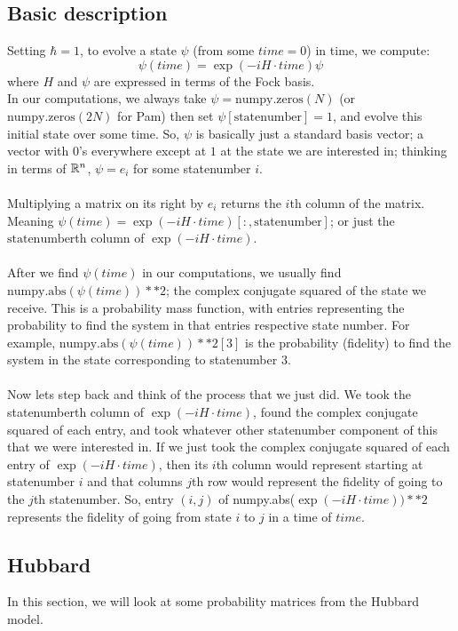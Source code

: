 \subsection{Basic description}
Setting $\hbar=1$, to evolve a state $\psi$ (from some $time=0$) in time, we compute:
\[\psi(time)=\exp(-iH\cdot time)\psi\]
where $H$ and $\psi$ are expressed in terms of the Fock basis. \\
In our computations, we always take $\psi=\text{numpy.zeros}(N)$ (or $\text{numpy.zeros}(2N)$ for Pam) then set $\psi[\text{statenumber}]=1$, and evolve this initial state over some time.
So, $\psi$ is basically just a standard basis vector; a vector with $0$'s everywhere except at $1$ at the state we are interested in; thinking in terms of $\mathbb{R}^n$, $\psi=e_i$ for some statenumber $i$. \\
\\
Multiplying a matrix on its right by $e_i$ returns the $i$th column of the matrix.
Meaning $\psi(time)=\exp(-iH\cdot time)[:,\text{statenumber}]$; or just the $\text{statenumber}$th column of $\exp(-iH\cdot time)$. \\
\\
After we find $\psi(time)$ in our computations, we usually find $\text{numpy.abs}(\psi(time))**2$; the complex conjugate squared of the state we receive.
This is a probability mass function, with entries representing the probability to find the system in that entries respective state number.
For example, $\text{numpy.abs}(\psi(time))**2[3]$ is the probability (fidelity) to find the system in the state corresponding to statenumber $3$. \\
\\
Now lets step back and think of the process that we just did.
We took the statenumberth column of $\exp(-iH\cdot time)$, found the complex conjugate squared of each entry, and took whatever other statenumber component of this that we were interested in.
If we just took the complex conjugate squared of each entry of $\exp(-iH\cdot time)$, then its $i$th column would represent starting at statenumber $i$ and that columns $j$th row would represent the fidelity of going to the $j$th statenumber.
So, entry $(i,j)$ of numpy.abs($\exp(-iH\cdot time))**2$ represents the fidelity of going from state $i$ to $j$ in a time of $time$.
\subsection{Hubbard}
In this section, we will look at some probability matrices from the Hubbard model.
